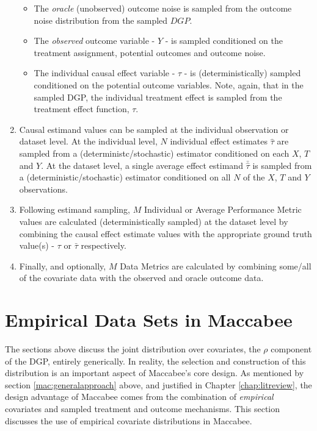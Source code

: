 \documentclass[../main.tex]{subfiles}
\begin{document}
\begin{enumerate}
\begin{itemize}
   \item The \textit{oracle} (unobserved) outcome noise is sampled from the outcome noise distribution from the sampled $DGP$.

   \item The \textit{observed} outcome variable - $Y$ - is sampled conditioned on the treatment assignment, potential outcomes and outcome noise.

   \item The individual causal effect variable - $\tau$ - is (deterministically) sampled conditioned on the potential outcome variables. Note, again, that in the sampled DGP, the individual treatment effect is sampled from the treatment effect function, $\tau$.

\end{itemize}

\item Causal estimand values can be sampled at the individual observation or dataset level. At the individual level, $N$ individual effect estimates $\hat{\tau}$ are sampled from a (deterministc/stochastic) estimator conditioned on each $X$, $T$ and $Y$. At the dataset level, a single average effect estimand $\bar{\hat{\tau}}$ is sampled from a (deterministic/stochastic) estimator conditioned on all $N$ of the $X$, $T$ and $Y$ observations.

\item Following estimand sampling, $M$ Individual or Average Performance Metric values are calculated (deterministically sampled) at the dataset level by combining the causal effect estimate values with the appropriate ground truth value(s) - $\tau$ or $\bar{\tau}$ respectively.

\item Finally, and optionally, $M$ Data Metrics are calculated by combining some/all of the covariate data with the observed and oracle outcome data.

\end{enumerate}

\section{Empirical Data Sets in Maccabee}
\label{mac:data}

The sections above discuss the joint distribution over covariates, the $\rho$ component of the DGP, entirely generically. In reality, the selection and construction of this distribution is an important aspect of Maccabee's core design. As mentioned by section \ref{mac:generalapproach} above, and justified in Chapter \ref{chap:litreview}, the design advantage of Maccabee comes from the combination of \textit{empirical} covariates and sampled treatment and outcome mechanisms. This section discusses the use of empirical covariate distributions in Maccabee.
\end{document}
